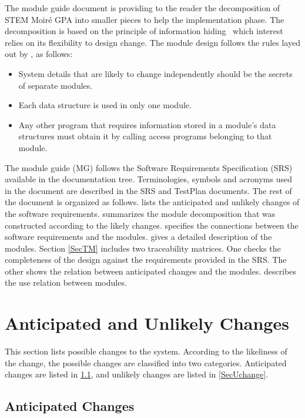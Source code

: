 \documentclass[12pt, titlepage]{article}
\newcommand{\progname}{STEM Moir{\'e} GPA}
\begin{document}
The module guide document is providing to the reader the decomposition of 
\progname{} into smaller pieces to help the implementation phase. The 
decomposition is based on the principle of information hiding~\cite{Parnas1972a} 
which interest relies on its flexibility to design change. The module design 
follows the rules layed out by \cite{ParnasEtAl1984}, as follows:
\begin{itemize}
\item System details that are likely to change independently should be the
  secrets of separate modules.
\item Each data structure is used in only one module.
\item Any other program that requires information stored in a module's data
  structures must obtain it by calling access programs belonging to that module.
\end{itemize}

The module guide (MG) follows the Software Requirements Specification (SRS) 
available in the documentation tree. Terminologies, symbols and acronyms used in 
the document are described in the SRS and TestPlan documents. The rest of the 
document is organized as follows.  lists the anticipated and 
unlikely changes of the software requirements.  summarizes the 
module decomposition that was constructed according to the likely changes. 
 specifies the connections between the software requirements 
and the modules.  gives a detailed description of the modules. 
Section \cref{SecTM} includes two traceability matrices. One checks the 
completeness of the design against the requirements provided in the SRS. The 
other shows the relation between anticipated changes and the modules. 
 describes the use relation between modules.

\section{Anticipated and Unlikely Changes} \label{SecChange}

This section lists possible changes to the system. According to the likeliness
of the change, the possible changes are classified into two
categories. Anticipated changes are listed in \cref{SecAchange}, and
unlikely changes are listed in \cref{SecUchange}.

\subsection{Anticipated Changes} \label{SecAchange}
\end{document}

